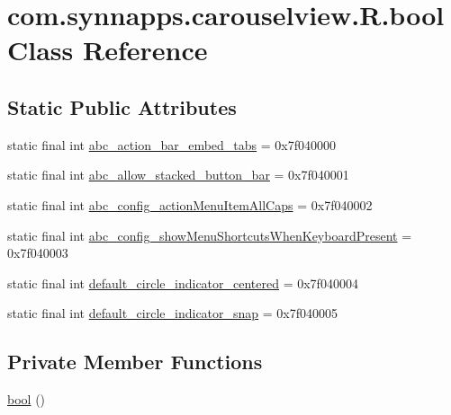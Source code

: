 \hypertarget{classcom_1_1synnapps_1_1carouselview_1_1_r_1_1bool}{}\section{com.\+synnapps.\+carouselview.\+R.\+bool Class Reference}
\label{classcom_1_1synnapps_1_1carouselview_1_1_r_1_1bool}
\subsection*{Static Public Attributes}
\begin{DoxyCompactItemize}
\item 
static final int \mbox{\hyperlink{classcom_1_1synnapps_1_1carouselview_1_1_r_1_1bool_a64c6ba7d492b8ed9752b320faf0b6aa8}{abc\+\_\+action\+\_\+bar\+\_\+embed\+\_\+tabs}} = 0x7f040000
\item 
static final int \mbox{\hyperlink{classcom_1_1synnapps_1_1carouselview_1_1_r_1_1bool_a9b3823b42c7b1b0e45c17d782c5f3209}{abc\+\_\+allow\+\_\+stacked\+\_\+button\+\_\+bar}} = 0x7f040001
\item 
static final int \mbox{\hyperlink{classcom_1_1synnapps_1_1carouselview_1_1_r_1_1bool_ac2b204349e05865cdc41dc2edc645560}{abc\+\_\+config\+\_\+action\+Menu\+Item\+All\+Caps}} = 0x7f040002
\item 
static final int \mbox{\hyperlink{classcom_1_1synnapps_1_1carouselview_1_1_r_1_1bool_a8e3bcb80fe249d4fec525bb18272f1fb}{abc\+\_\+config\+\_\+show\+Menu\+Shortcuts\+When\+Keyboard\+Present}} = 0x7f040003
\item 
static final int \mbox{\hyperlink{classcom_1_1synnapps_1_1carouselview_1_1_r_1_1bool_a4337686b2a21eb05e94802443a959cc0}{default\+\_\+circle\+\_\+indicator\+\_\+centered}} = 0x7f040004
\item 
static final int \mbox{\hyperlink{classcom_1_1synnapps_1_1carouselview_1_1_r_1_1bool_a64387ff7acb7797420eacd71b404b6d0}{default\+\_\+circle\+\_\+indicator\+\_\+snap}} = 0x7f040005
\end{DoxyCompactItemize}
\subsection*{Private Member Functions}
\begin{DoxyCompactItemize}
\item 
\mbox{\hyperlink{classcom_1_1synnapps_1_1carouselview_1_1_r_1_1bool_af36404f966b7dbddfdb3d64c855716ee}{bool}} ()
\end{DoxyCompactItemize}


